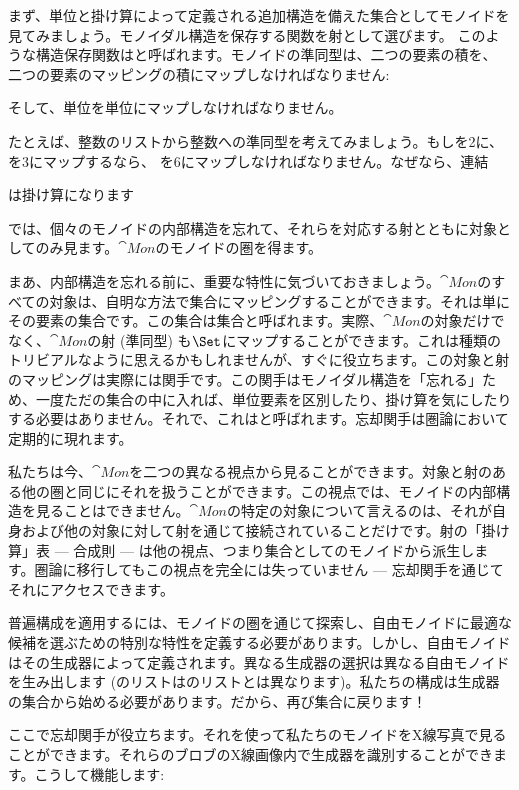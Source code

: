 まず、単位と掛け算によって定義される追加構造を備えた集合としてモノイドを見てみましょう。モノイダル構造を保存する関数を射として選びます。
このような構造保存関数はと呼ばれます。モノイドの準同型は、二つの要素の積を、
二つの要素のマッピングの積にマップしなければなりません: 

そして、単位を単位にマップしなければなりません。

たとえば、整数のリストから整数への準同型を考えてみましょう。もし\code{{[}2{]}}を2に、\code{{[}3{]}}を3にマップするなら、
\code{{[}2, 3{]}}を6にマップしなければなりません。なぜなら、連結

は掛け算になります

では、個々のモノイドの内部構造を忘れて、それらを対応する射とともに対象としてのみ見ます。$\cat{Mon}$のモノイドの圏を得ます。

まあ、内部構造を忘れる前に、重要な特性に気づいておきましょう。$\cat{Mon}$のすべての対象は、自明な方法で集合にマッピングすることができます。それは単にその要素の集合です。この集合は集合と呼ばれます。実際、$\cat{Mon}$の対象だけでなく、$\cat{Mon}$の射 (準同型) も$\Set$にマップすることができます。これは種類のトリビアルなように思えるかもしれませんが、すぐに役立ちます。この対象と射のマッピングは実際には関手です。この関手はモノイダル構造を「忘れる」ため、一度ただの集合の中に入れば、単位要素を区別したり、掛け算を気にしたりする必要はありません。それで、これはと呼ばれます。忘却関手は圏論において定期的に現れます。

私たちは今、$\cat{Mon}$を二つの異なる視点から見ることができます。対象と射のある他の圏と同じにそれを扱うことができます。この視点では、モノイドの内部構造を見ることはできません。$\cat{Mon}$の特定の対象について言えるのは、それが自身および他の対象に対して射を通じて接続されていることだけです。射の「掛け算」表 --- 合成則 --- は他の視点、つまり集合としてのモノイドから派生します。圏論に移行してもこの視点を完全には失っていません --- 忘却関手を通じてそれにアクセスできます。

普遍構成を適用するには、モノイドの圏を通じて探索し、自由モノイドに最適な候補を選ぶための特別な特性を定義する必要があります。しかし、自由モノイドはその生成器によって定義されます。異なる生成器の選択は異なる自由モノイドを生み出します (のリストはのリストとは異なります)。私たちの構成は生成器の集合から始める必要があります。だから、再び集合に戻ります！

ここで忘却関手が役立ちます。それを使って私たちのモノイドをX線写真で見ることができます。それらのブロブのX線画像内で生成器を識別することができます。こうして機能します: 

